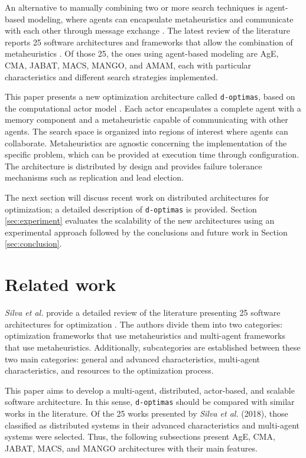 \documentclass[preprint,12pt]{elsarticle}
\begin{document}
An alternative to manually combining two or more search techniques is agent-based modeling, where agents can encapsulate metaheuristics and communicate with each other through message exchange \cite{gong2015, zheng2015}. The latest review of the literature reports 25 software architectures and frameworks that allow the combination of metaheuristics \cite{silva2018}. Of those 25, the ones using agent-based modeling are AgE, CMA, JABAT, MACS, MANGO, and AMAM, each with particular characteristics and different search strategies implemented. 

This paper presents a new optimization architecture called \texttt{d-optimas}, based on the computational actor model \cite{hewitt2013}. Each actor encapsulates a complete agent with a memory component and a metaheuristic capable of communicating with other agents. The search space is organized into regions of interest where agents can collaborate. Metaheuristics are agnostic concerning the implementation of the specific problem, which can be provided at execution time through configuration. The architecture is distributed by design and provides failure tolerance mechanisms such as replication and lead election. 

The next section will discuss recent work on distributed architectures for optimization; a detailed description of \texttt{d-optimas} is provided. Section \ref{sec:experiment} 
 evaluates the scalability of the new architectures using an experimental approach followed by the conclusions and future work in Section \ref{sec:conclusion}. 



\section{Related work}
\label{sec:relatedWork}

\textit{Silva et al.} provide a detailed review of the literature presenting 25 software architectures for optimization \cite{silva2018}. The authors divide them into two categories: optimization frameworks that use metaheuristics and multi-agent frameworks that use metaheuristics. Additionally, subcategories are established between these two main categories: general and advanced characteristics, multi-agent characteristics, and resources to the optimization process.

This paper aims to develop a multi-agent, distributed, actor-based, and scalable software architecture. In this sense, \texttt{d-optimas} should be compared with similar works in the literature. Of the 25 works presented by\textit{ Silva et al.} (2018), those classified as distributed systems in their advanced characteristics and multi-agent systems were selected. Thus, the following subsections present AgE, CMA, JABAT, MACS, and MANGO architectures with their main features. 
\end{document}
